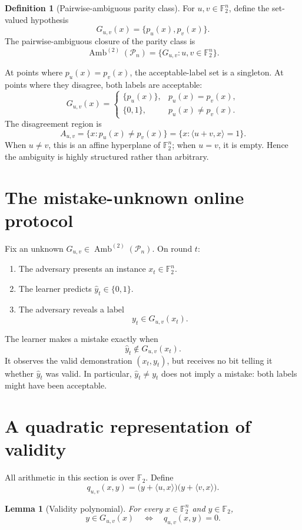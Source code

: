\documentclass[11pt]{article}
\newtheorem{lemma}[theorem]{Lemma}
\theoremstyle{definition}
\newtheorem{definition}[theorem]{Definition}
\theoremstyle{remark}
\newcommand{\F}{\mathbb{F}_2}
\newcommand{\Pn}{\mathcal{P}_n}
\newcommand{\Amb}{\operatorname{Amb}}
\newcommand{\ip}[2]{\langle #1,#2\rangle}
\begin{document}
\begin{definition}[Pairwise-ambiguous parity class]
For $u,v\in\F^n$, define the set-valued hypothesis
\[
  G_{u,v}(x)=\{p_u(x),p_v(x)\}.
\]
The pairwise-ambiguous closure of the parity class is
\[
  \Amb^{(2)}(\Pn)
  =
  \{G_{u,v}:u,v\in\F^n\}.
\]
\end{definition}

At points where $p_u(x)=p_v(x)$, the acceptable-label set is a singleton.
At points where they disagree, both labels are acceptable:
\[
G_{u,v}(x)=
\begin{cases}
\{p_u(x)\}, & p_u(x)=p_v(x),\\
\{0,1\}, & p_u(x)\neq p_v(x).
\end{cases}
\]
The disagreement region is
\[
A_{u,v}
=
\{x:p_u(x)\neq p_v(x)\}
=
\{x:\ip{u+v}{x}=1\}.
\]
When $u\neq v$, this is an affine hyperplane of $\F^n$; when $u=v$, it is
empty.  Hence the ambiguity is highly structured rather than arbitrary.

\section{The mistake-unknown online protocol}

Fix an unknown $G_{u,v}\in\Amb^{(2)}(\Pn)$.  On round $t$:
\begin{enumerate}[label=\arabic*.]
  \item The adversary presents an instance $x_t\in\F^n$.
  \item The learner predicts $\widehat y_t\in\{0,1\}$.
  \item The adversary reveals a label
  \[
    y_t\in G_{u,v}(x_t).
  \]
\end{enumerate}
The learner makes a mistake exactly when
\[
  \widehat y_t\notin G_{u,v}(x_t).
\]
It observes the valid demonstration $(x_t,y_t)$, but receives no bit telling
it whether $\widehat y_t$ was valid.  In particular,
$\widehat y_t\neq y_t$ does not imply a mistake: both labels might have been
acceptable.

\section{A quadratic representation of validity}

All arithmetic in this section is over $\F$.  Define
\[
q_{u,v}(x,y)
=
\bigl(y+\ip{u}{x}\bigr)
\bigl(y+\ip{v}{x}\bigr).
\]

\begin{lemma}[Validity polynomial]
For every $x\in\F^n$ and $y\in\F$,
\[
  y\in G_{u,v}(x)
  \quad\Longleftrightarrow\quad
  q_{u,v}(x,y)=0.
\]
\end{lemma}
\end{document}
